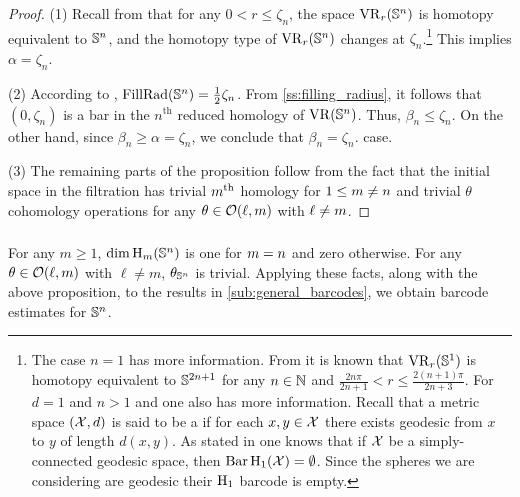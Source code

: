 \begin{proof}
	(1) Recall from \cite[Thm.~7.1]{lim2020vietoris} that for any $0 < r \leq \zeta_n$, the space $\operatorname{VR}_r(\mathbb{S}^n)$ is homotopy equivalent to $\mathbb{S}^n$, and the homotopy type of $\operatorname{VR}_r(\mathbb{S}^n)$ changes at $\zeta_n$.\footnote{
		The case $n = 1$ has more information.
		From \cite[Thm.~7.4]{adamaszek2017vietoris} it is known that $\operatorname{VR}_r(\mathbb{S}^1)$ is homotopy equivalent to $\mathbb{S}^{2n+1}$ for any $n \in \mathbb{N}$ and $\frac{2n\pi}{2n+1} < r \leq \frac{2(n+1)\pi}{2n+3}$.
		For $d=1$ and $n > 1$ and one also has more information.
		Recall that a metric space $(\mathcal{X}, d)$ is said to be a  if for each $x, y \in \mathcal{X}$ there exists geodesic from $x$ to $y$ of length $d(x, y)$.
		As stated in \cite[Prop.~7.10]{virk20201} one knows that if $\mathcal{X}$ be a simply-connected geodesic space, then $\operatorname{Bar}\mathrm{H}_1(\mathcal{X}) = \emptyset$.
		Since the spheres we are considering are geodesic their $\mathrm{H}_1$ barcode is empty.}
	This implies $\alpha=\zeta_n$.

	(2) According to \cite{katz1983filling}, \(\mathrm{FillRad}(\mathbb{S}^n) = \frac{1}{2}\zeta_n\).
	From \cref{ss:filling_radius}, it follows that \((0, \zeta_n)\) is a bar in the \(n^{\text{th}}\) reduced homology of \(\operatorname{VR} (\mathbb{S}^n)\).
	Thus, \(\beta_n \leq \zeta_n\).
	On the other hand, since \(\beta_n \geq \alpha = \zeta_n\), we conclude that \(\beta_n = \zeta_n\). case.

	(3) The remaining parts of the proposition follow from the fact that the initial space in the filtration has trivial $m^{\mathrm{th}}$ homology for $1\leq m \neq n$ and trivial $\theta$ cohomology operations for any \(\theta \in \mathcal{O}(\ell,m)\) with \(\ell \neq m\).
\end{proof}

\subsubsection{}

For any \(m \geq 1\), \(\dim \operatorname{H}_m(\mathbb{S}^n)\) is one for \(m = n\) and zero otherwise.
For any \(\theta \in \mathcal{O}(\ell, m)\) with \(\ell \neq m\), \(\theta_{\mathbb{S}^n}\) is trivial.
Applying these facts, along with the above proposition, to the results in \cref{sub:general_barcodes}, we obtain barcode estimates for \(\mathbb{S}^n\).

